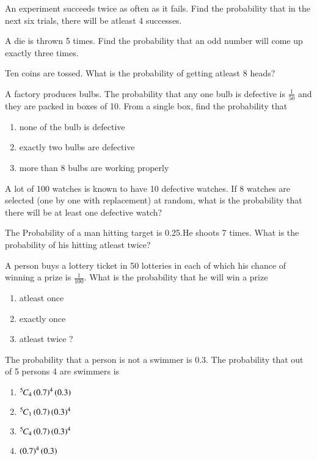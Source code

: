 \solution

\item An experiment succeeds twice as often as it fails. Find the probability that in the next
six trials, there will be atleast 4 successes.
\solution
\item A die is thrown 5 times. Find the probability that an odd number will come up exactly three times.
\solution
\item Ten coins are tossed. What is the probability of getting atleast 8 heads?
\\
\solution 

\item A factory produces bulbs. The probability that any one bulb is defective is $\frac{1}{50}$ and they are packed in boxes of 10. From a single box, find the probability that
\begin{enumerate}
    \item none of the bulb is defective 
    \item exactly two bulbs are defective 
    \item more than 8 bulbs are working properly
\end{enumerate}
\solution

\item A lot of 100 watches is known to have 10 defective watches. If 8 watches are
selected (one by one with replacement) at random, what is the probability that
there will be at least one defective watch?
\item The Probability of a man hitting  target is 0.25.He shoots 7 times. What is the probability of his hitting atleast twice?\\
\item A person buys a lottery ticket in 50 lotteries in each of which his chance of winning a prize is $\frac{1}{100}$. What is the probability that he will win a prize
\begin{enumerate}[label=(\alph*)]
    \item  atleast once 
    \item exactly once 
    \item atleast twice ?
\end{enumerate}

\item The probability that a person is not a swimmer is 0.3. The probability that out of
5 persons 4 are swimmers is
\begin{enumerate}
    \item ${{}^{5}\mkern-1muC_{4}}\left(0.7\right)^4\left(0.3\right)$
    \item ${{}^{5}\mkern-1muC_{1}}\left(0.7\right)\left(0.3\right)^4$
    \item ${{}^{5}\mkern-1muC_{4}}\left(0.7\right)\left(0.3\right)^4$
    \item $\left(0.7\right)^4\left(0.3\right)$
\end{enumerate}
